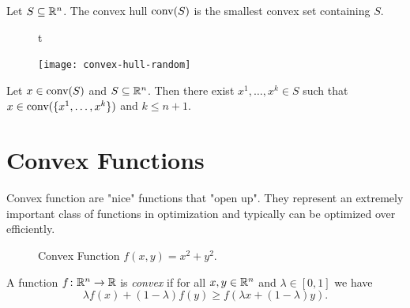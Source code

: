 \documentclass[../open-optimization/open-optimization.tex]{subfiles}
\begin{document}
\begin{definition}
Let $S\subseteq {\mathbb{R}}^n$.  The convex hull $\textup{conv}(S)$ is the smallest convex set containing $S$.
\end{definition}

\begin{figure}[H]t
\begin{center}
\texttt{[image: convex-hull-random]} \ \ 
\end{center}
\end{figure}
\begin{theorem}
Let $x \in \textup{conv}(S)$ and $S \subseteq {\mathbb{R}}^n$.  Then there exist $x^1, \dots, x^k \in S$ such that $x \in \textup{conv}(\{x^1, \dots, x^k\})$ and $k \leq n+1$.
\end{theorem}




\section{Convex Functions}


Convex function are "nice" functions that "open up".  They represent an extremely important class of functions in optimization and typically can be optimized over efficiently.


\begin{figure}[H]
\begin{center}
\end{center}
    \caption{Convex Function $f(x,y) = x^2 + y^2$.}
\end{figure} 





\begin{definition}
A function $f \colon {\mathbb{R}}^n \to {\mathbb{R}}$ is \emph{convex} if for all $x,y \in {\mathbb{R}}^n$ and $\lambda \in [0,1]$ we have 
\begin{equation}
\lambda f(x) + (1-\lambda)f(y) \geq f(\lambda x + (1-\lambda) y).
\end{equation}
\end{definition}
\end{document}
